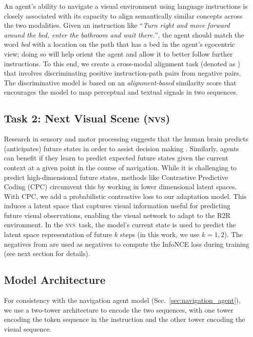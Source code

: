 \documentclass[10pt,twocolumn,letterpaper]{article}
\newcommand{\tasknvs}{\textsc{nvs}}
\begin{document}
An agent's ability to navigate a visual environment using language instructions is closely associated with its capacity to align semantically similar concepts across the two modalities. Given an instruction like ``\textit{Turn right and move forward around the bed, enter the bathroom and wait there.}'', the agent should match the word \textit{bed} with a location on the path that has a bed in the agent's egocentric view; doing so will help orient the agent and allow it to better follow further instructions. To this end, we create a cross-modal alignment task (denoted as {\taskcma}) that involves discriminating positive instruction-path pairs from negative pairs. The discriminative model is based on an \textit{alignment-based} similarity score that encourages the model to map perceptual and textual signals in two sequences. 


\subsection{Task 2: Next Visual Scene (\tasknvs)}

Research in sensory and motor processing suggests that the human brain predicts (anticipates) future states in order to assist decision making \cite{Luca2016Optimal,Bubic2010Prediction}. Similarly, agents can benefit if they learn to predict expected future states given the current context at a given point in the course of navigation.
While it is challenging to predict high-dimensional future states, methods like Contrastive Predictive Coding (CPC) \cite{Oord2018RepresentationLW} circumvent this by working in lower dimensional latent spaces.
With CPC, we add a probabilistic contrastive loss to our adaptation model. This induces a latent space that captures visual information useful for predicting future visual observations, enabling the visual network to adapt to the R2R environment. In the \tasknvs\ task, the model's current state is used to predict the latent space representation of future $k$ steps (in this work, we use $k={1,2}$).
The negatives from {\taskcma} are used as negatives to compute the InfoNCE \cite{Oord2018RepresentationLW} loss during training (see next section for details).


\subsection{Model Architecture}
\label{subsec:model_arch}
For consistency with the navigation agent model (Sec.~\ref{sec:navigation_agent}), we use a two-tower architecture to encode the two sequences, with one tower encoding the token sequence in the instruction and the other tower encoding the visual sequence.
\end{document}
